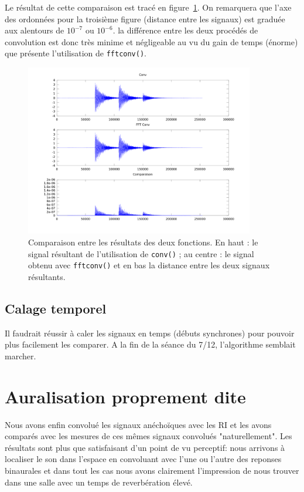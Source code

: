 \documentclass[12pt]{article}
\begin{document}
Le résultat de cette comparaison est tracé en figure~\ref{plot_comp}. On remarquera que l'axe des ordonnées pour la
troisième figure (distance entre les signaux) est graduée aux alentours de $10^{-7}$ ou $10^{-6}$. la différence entre
les deux procédés de convolution est donc très minime et négligeable au vu du gain de temps (énorme) que présente
l'utilisation de \texttt{fftconv()}.

\begin{figure}[h!]
\begin{center}
\includegraphics[width=10cm]{compare}
\caption{\label{plot_comp}Comparaison entre les résultats des deux fonctions. En haut : le signal résultant de
l'utilisation de \texttt{conv()} ; au centre : le signal obtenu avec \texttt{fftconv()} et en bas la distance entre les
deux signaux résultants.}
\end{center}
\end{figure}

\subsection{Calage temporel} %

Il faudrait réussir à caler les signaux en temps (débuts synchrones) pour pouvoir plus facilement les comparer. A la fin
de la séance du 7/12, l'algorithme semblait marcher.

\section{Auralisation proprement dite} %

Nous avons enfin convolué les signaux anéchoïques avec les RI et les avons comparés avec les mesures de ces mêmes signaux convolués "naturellement". Les résultats sont plus que satisfaisant d'un point de vu perceptif: nous arrivons à localiser le son dans l'espace en convoluant avec l'une ou l'autre des reponses binaurales et dans tout les cas nous avons clairement l'impression de nous trouver dans une salle avec un temps de reverbération élevé.
\end{document}

